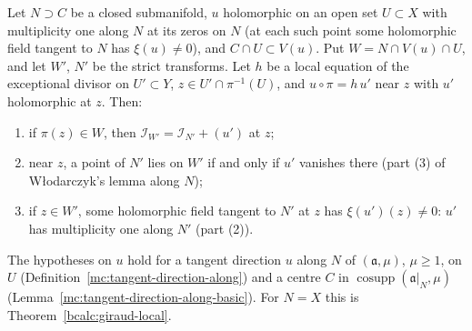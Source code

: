 \begin{theorem}
\label{bcalc:giraud-local-along}
\mixedleanok
Let \(N\supset C\) be a closed submanifold, \(u\) holomorphic on an open set \(U\subset X\) with multiplicity one along \(N\) at its zeros on \(N\) (at each
such point some holomorphic field tangent to \(N\) has \(\xi(u)\ne0\)), and \(C\cap U\subset V(u)\). Put \(W=N\cap V(u)\cap U\), and let \(W'\), \(N'\) be the strict
transforms. Let \(h\) be a local equation of the exceptional divisor on \(U'\subset Y\), \(z\in U'\cap\pi^{-1}(U)\), and \(u\circ\pi=h\,u'\) near \(z\) with \(u'\)
holomorphic at \(z\). Then:
\begin{enumerate}
\item if \(\pi(z)\in W\), then \(\mathcal I_{W'}=\mathcal I_{N'}+(u')\) at \(z\);
\item near \(z\), a point of \(N'\) lies on \(W'\) if and only if \(u'\) vanishes there (part (3) of Włodarczyk's lemma along \(N\));
\item if \(z\in W'\), some holomorphic field tangent to \(N'\) at \(z\) has \(\xi(u')(z)\ne0\): \(u'\) has multiplicity one along \(N'\) (part (2)).
\end{enumerate}
The hypotheses on \(u\) hold for a tangent direction \(u\) along \(N\) of \((\mathfrak a,\mu)\), \(\mu\ge1\), on \(U\) (Definition~\ref{mc:tangent-direction-along})
and a centre \(C\) in \(\operatorname{cosupp}(\mathfrak a|_N,\mu)\) (Lemma~\ref{mc:tangent-direction-along-basic}). For \(N=X\) this is
Theorem~\ref{bcalc:giraud-local}.
\end{theorem}
